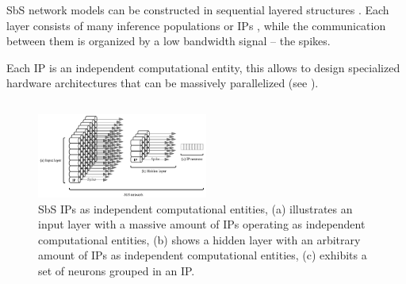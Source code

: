 SbS network models can be constructed in sequential layered structures \cite{rotermund2019Backpropagation}. Each layer consists of many inference populations or IPs , while the communication between them is organized by a low bandwidth signal -- the spikes.

 Each IP is an independent computational entity, this allows to design specialized hardware architectures that can be massively parallelized (see ).

\subsection{}


\begin{figure}
	\centering
	\includegraphics[width=0.5\textwidth]{../figures/SbS_layer.pdf}
	\caption{SbS IPs as independent computational entities, (a) illustrates an input layer with a massive amount of IPs operating as independent computational entities, (b) shows a hidden layer with an arbitrary amount of IPs as independent computational entities, (c) exhibits a set of neurons grouped in an IP.}
	\label{fig:SbS_layer}
\end{figure}



